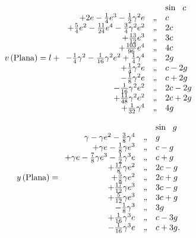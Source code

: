\documentclass[11pt]{article}
\begin{document}
\[
v\,(\text{Plana}) = l +
\begin{array}{r@{\quad}l@{\quad}l}
 & & \sin\ \ c \\
 + 2e - \tfrac{1}{4}e^{3} - \tfrac{1}{2}\gamma^{2}e & \text{,,} & c\\
 + \tfrac{5}{4}e^{2} - \tfrac{11}{24}e^{4} - \tfrac{3}{4}\gamma^{2}e^{2} & \text{,,} & 2c\\
 + \tfrac{13}{12}e^{3} & \text{,,} & 3c\\
 + \tfrac{103}{96}e^{4} & \text{,,} & 4c\\
 - \tfrac{1}{4}\gamma^{2} - \tfrac{1}{16}\gamma^{2}e^{2} + \tfrac{1}{4}\gamma^{4} & \text{,,} & 2g\\
 + \tfrac{1}{4}\gamma^{2}e & \text{,,} & c - 2g\\
 - \tfrac{1}{8}\gamma^{2}e & \text{,,} & c + 2g\\
 - \tfrac{1}{16}\gamma^{2}e^{2} & \text{,,} & 2c - 2g\\
 + \tfrac{11}{48}\gamma^{2}e^{2} & \text{,,} & 2c + 2g\\
 + \tfrac{1}{32}\gamma^{4} & \text{,,} & 4g
\end{array}
\]

\[
y\,(\text{Plana}) =
\begin{array}{r@{\quad}l@{\quad}l}
 & & \sin\ \ g \\
\gamma - \gamma e^{2} - \tfrac{3}{8}\gamma^{4} & \text{,,} & g\\
+ \gamma e - \tfrac{1}{8}\gamma e^{3} & \text{,,} & c - g\\
+ \gamma e - \tfrac{7}{8}\gamma e^{3} - \tfrac{1}{2}\gamma^{3}e & \text{,,} & c + g\\
+ \tfrac{17}{8}\gamma e^{2} & \text{,,} & 2c - g\\
+ \tfrac{5}{8}\gamma e^{2} & \text{,,} & 2c + g\\
+ \tfrac{17}{12}\gamma e^{3} & \text{,,} & 3c - g\\
+ \tfrac{5}{12}\gamma e^{3} & \text{,,} & 3c + g\\
- \tfrac{1}{8}\gamma^{3} & \text{,,} & 3g\\
+ \tfrac{1}{16}\gamma^{3}e & \text{,,} & c - 3g\\
- \tfrac{1}{16}\gamma^{3}e & \text{,,} & c + 3g.
\end{array}
\]
\end{document}
